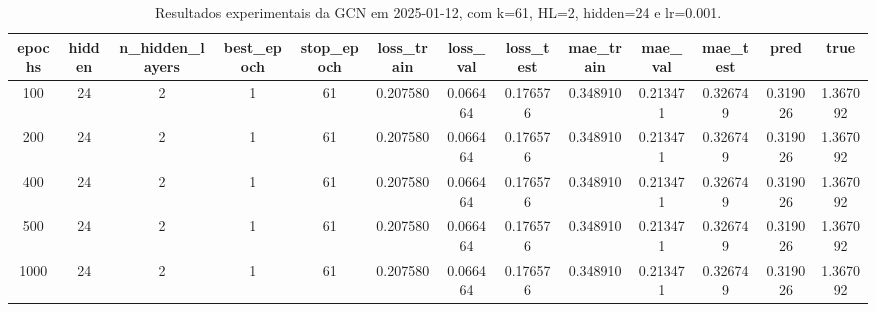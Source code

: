 \begin{table}[h]
\centering
\caption{Resultados experimentais da GCN em 2025-01-12, com k=61, HL=2, hidden=24 e lr=0.001.}
\label{tab:gcn_results_k61_hl2_h24_d20250112}
\begin{tabular}{ccccccccccccc}
\toprule
epochs & hidden & n\_hidden\_layers & best\_epoch & stop\_epoch & loss\_train & loss\_val & loss\_test & mae\_train & mae\_val & mae\_test & pred & true \\
\midrule
100 & 24 & 2 & 1 & 61 & 0.207580 & 0.066464 & 0.176576 & 0.348910 & 0.213471 & 0.326749 & 0.319026 & 1.367092 \\
200 & 24 & 2 & 1 & 61 & 0.207580 & 0.066464 & 0.176576 & 0.348910 & 0.213471 & 0.326749 & 0.319026 & 1.367092 \\
400 & 24 & 2 & 1 & 61 & 0.207580 & 0.066464 & 0.176576 & 0.348910 & 0.213471 & 0.326749 & 0.319026 & 1.367092 \\
500 & 24 & 2 & 1 & 61 & 0.207580 & 0.066464 & 0.176576 & 0.348910 & 0.213471 & 0.326749 & 0.319026 & 1.367092 \\
1000 & 24 & 2 & 1 & 61 & 0.207580 & 0.066464 & 0.176576 & 0.348910 & 0.213471 & 0.326749 & 0.319026 & 1.367092 \\
\bottomrule
\end{tabular}
\end{table}
